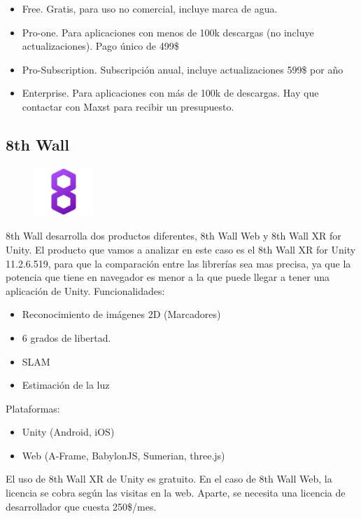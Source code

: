 \begin{itemize}
\item Free. Gratis, para uso no comercial, incluye marca de agua.
\item Pro-one. Para aplicaciones con menos de 100k descargas (no incluye actualizaciones). Pago único de 499\$ 
\item Pro-Subscription. Subscripción anual, incluye actualizaciones 599\$ por año
\item Enterprise. Para aplicaciones con más de 100k de descargas. Hay que contactar con Maxst para recibir un presupuesto.
\end{itemize}

\clearpage
\subsection{8th Wall}
\begin{figure}[H]
    \centering
    \includegraphics[width=0.2\textwidth]{Images/8thWall_Logo.jpeg}
    \label{fig:8th Wall}
\end{figure}

8th Wall desarrolla dos productos diferentes, 8th Wall Web y 8th Wall XR for Unity. El producto que vamos a analizar en este caso es el 8th Wall XR for Unity 11.2.6.519, para que la comparación entre las librerías sea mas precisa, ya que la potencia que tiene en navegador es menor a la que puede llegar a tener una aplicación de Unity. \cite{8thWall}
Funcionalidades:
\begin{itemize}
\item Reconocimiento de imágenes 2D (Marcadores)
\item 6 grados de libertad.
\item SLAM
\item Estimación de la luz
\end{itemize}

Plataformas:
\begin{itemize}
\item Unity (Android, iOS)
\item Web (A-Frame, BabylonJS, Sumerian, three.js)
\end{itemize}
El uso de 8th Wall XR de Unity es gratuito. En el caso de 8th Wall Web, la licencia se cobra según las visitas en la web. Aparte, se necesita una licencia de desarrollador que cuesta 250\$/mes.\\


